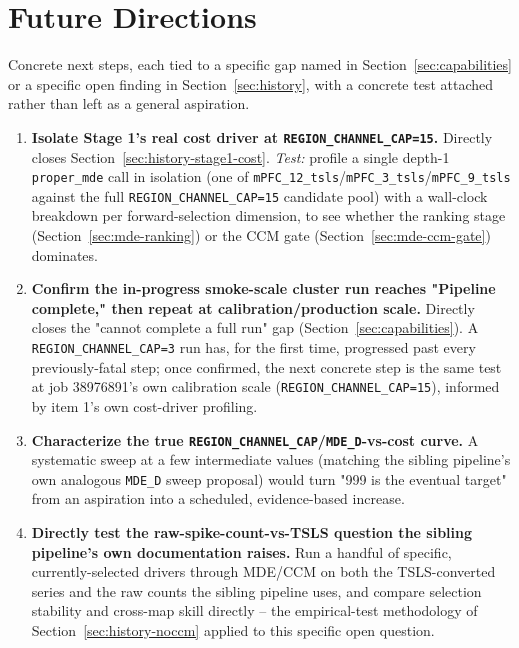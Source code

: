 \documentclass[11pt]{article}
\begin{document}
\newpage
\section{Future Directions}
\label{sec:future}
Concrete next steps, each tied to a specific gap named in Section~\ref{sec:capabilities} or a specific open finding in Section~\ref{sec:history}, with a concrete test attached rather than left as a general aspiration.

\begin{enumerate}[leftmargin=1.4em]
  \item \textbf{Isolate Stage 1's real cost driver at \texttt{REGION\_CHANNEL\_CAP=15}.} Directly closes Section~\ref{sec:history-stage1-cost}. \emph{Test:} profile a single depth-1 \texttt{proper\_mde} call in isolation (one of \texttt{mPFC\_12\_tsls}/\texttt{mPFC\_3\_tsls}/\texttt{mPFC\_9\_tsls} against the full \texttt{REGION\_CHANNEL\_CAP=15} candidate pool) with a wall-clock breakdown per forward-selection dimension, to see whether the ranking stage (Section~\ref{sec:mde-ranking}) or the CCM gate (Section~\ref{sec:mde-ccm-gate}) dominates.
  \item \textbf{Confirm the in-progress smoke-scale cluster run reaches "Pipeline complete," then repeat at calibration/production scale.} Directly closes the "cannot complete a full run" gap (Section~\ref{sec:capabilities}). A \texttt{REGION\_CHANNEL\_CAP=3} run has, for the first time, progressed past every previously-fatal step; once confirmed, the next concrete step is the same test at job 38976891's own calibration scale (\texttt{REGION\_CHANNEL\_CAP=15}), informed by item 1's own cost-driver profiling.
  \item \textbf{Characterize the true \texttt{REGION\_CHANNEL\_CAP}/\texttt{MDE\_D}-vs-cost curve.} A systematic sweep at a few intermediate values (matching the sibling pipeline's own analogous \texttt{MDE\_D} sweep proposal) would turn "999 is the eventual target" from an aspiration into a scheduled, evidence-based increase.
  \item \textbf{Directly test the raw-spike-count-vs-TSLS question the sibling pipeline's own documentation raises.} Run a handful of specific, currently-selected drivers through MDE/CCM on both the TSLS-converted series and the raw counts the sibling pipeline uses, and compare selection stability and cross-map skill directly -- the empirical-test methodology of Section~\ref{sec:history-noccm} applied to this specific open question.

\end{enumerate}
\end{document}
